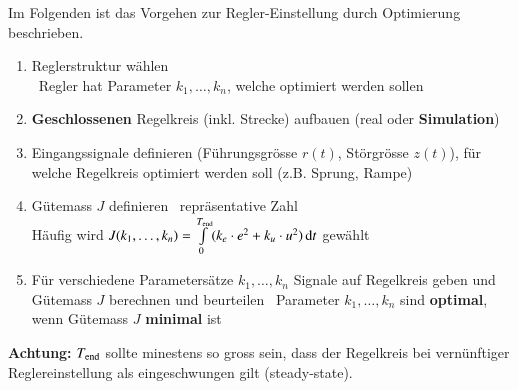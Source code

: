 Im Folgenden ist das Vorgehen zur Regler-Einstellung durch Optimierung beschrieben.

\begin{enumerate}
    \item Reglerstruktur wählen \\
        \textrightarrow\ Regler hat Parameter $k_1, \ldots, k_n$, welche optimiert werden sollen
    \item \textbf{Geschlossenen} Regelkreis (inkl. Strecke) aufbauen (real oder \textbf{Simulation})
    \item Eingangssignale definieren (Führungsgrösse $r(t)$, Störgrösse $z(t)$), für welche Regelkreis optimiert werden soll
        (z.B. Sprung, Rampe)
    \item Gütemass $J$ definieren \textrightarrow\ repräsentative Zahl\\
        Häufig wird $J(k_1, \ldots, k_n) = \int\limits_0^{T_{\rm end}} (k_e \cdot e^2 +k_u \cdot u^2) \mathop{} \! \mathrm{d} t$ gewählt
    \item Für verschiedene Parametersätze $k_1, \ldots, k_n$ Signale auf Regelkreis geben und Gütemass $J$ berechnen und beurteilen
        \textrightarrow\ Parameter $k_1, \ldots, k_n$ sind \textbf{optimal}, wenn Gütemass $J$ \textbf{minimal} ist
\end{enumerate}

\textbf{Achtung:} $T_{\rm end}$ sollte minestens so gross sein, dass der Regelkreis bei vernünftiger Reglereinstellung als
eingeschwungen gilt (steady-state).


